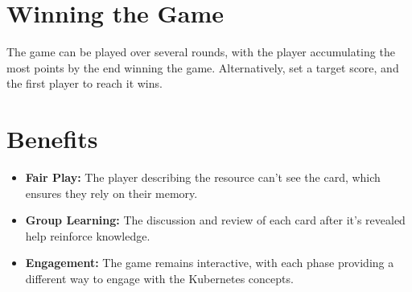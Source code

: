 \documentclass{article}
\begin{document}
\section*{Winning the Game}
The game can be played over several rounds, with the player accumulating the most points by the end winning the game. Alternatively, set a target score, and the first player to reach it wins.

\section*{Benefits}
\begin{itemize}
    \item \textbf{Fair Play:} The player describing the resource can't see the card, which ensures they rely on their memory.
    \item \textbf{Group Learning:} The discussion and review of each card after it’s revealed help reinforce knowledge.
    \item \textbf{Engagement:} The game remains interactive, with each phase providing a different way to engage with the Kubernetes concepts.
\end{itemize}
\end{document}
